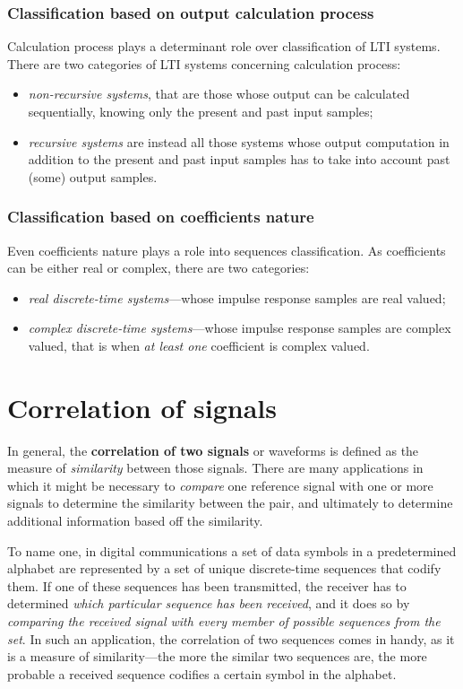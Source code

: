 \documentclass[\documentfontsize, twocolumn]{\classname}
\begin{document}
\subsubsection{Classification based on output calculation process}
Calculation process plays a determinant role over classification of LTI systems. There are two categories of LTI systems concerning calculation process:
\begin{itemize}
    \item \emph{non-recursive systems}, that are those whose output can be
    	    calculated sequentially, knowing only the present and past input
    	    	samples;
    \item \emph{recursive systems} are instead all those systems whose output
    	    computation in addition to the present and past input samples has
    	    	to take into account past (some) output samples.
\end{itemize}

\subsubsection{Classification based on coefficients nature}
Even coefficients nature plays a role into sequences classification. As coefficients can be either real or complex, there are two categories:
\begin{itemize}
    \item \emph{real discrete-time systems}---whose impulse response samples are real valued;
    \item \emph{complex discrete-time systems}---whose impulse response samples are complex valued, that is when \emph{at least one} coefficient is complex valued.
\end{itemize}

\section{Correlation of signals}

In general, the \textbf{correlation of two signals} or waveforms is defined as the measure of \emph{similarity} between those signals. There are many applications in which it might be necessary to \emph{compare} one reference signal with one or more signals to determine the similarity between the pair, and ultimately to determine additional information based off the similarity.

To name one, in digital communications a set of data symbols in a predetermined alphabet are represented by a set of unique discrete-time sequences that codify them. If one of these sequences has been transmitted, the receiver has to determined \emph{which particular sequence has been received}, and it does so by \emph{comparing the received signal with every member of possible sequences from the set}. In such an application, the correlation of two sequences comes in handy, as it is a measure of similarity---the more the similar two sequences are, the more probable a received sequence codifies a certain symbol in the alphabet.
\end{document}
